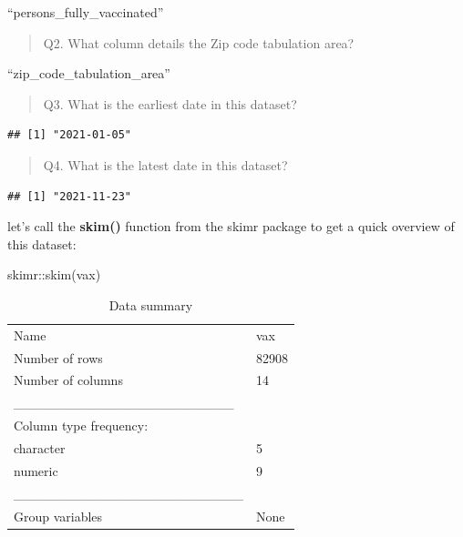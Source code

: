 \documentclass[
]{article}
\newenvironment{Shaded}{\begin{snugshade}}{\end{snugshade}}
\newcommand{\FunctionTok}[1]{\textcolor[rgb]{0.00,0.00,0.00}{#1}}
\newcommand{\NormalTok}[1]{#1}
\newcommand{\SpecialCharTok}[1]{\textcolor[rgb]{0.00,0.00,0.00}{#1}}
\begin{document}
``persons\_fully\_vaccinated''

\begin{quote}
Q2. What column details the Zip code tabulation area?
\end{quote}

``zip\_code\_tabulation\_area''

\begin{quote}
Q3. What is the earliest date in this dataset?
\end{quote}

\begin{Shaded}
\end{Shaded}

\begin{verbatim}
## [1] "2021-01-05"
\end{verbatim}

\begin{quote}
Q4. What is the latest date in this dataset?
\end{quote}

\begin{Shaded}
\end{Shaded}

\begin{verbatim}
## [1] "2021-11-23"
\end{verbatim}

let's call the \textbf{skim()} function from the skimr package to get a
quick overview of this dataset:

\begin{Shaded}
\begin{Highlighting}[]
\NormalTok{skimr}\SpecialCharTok{::}\FunctionTok{skim}\NormalTok{(vax)}
\end{Highlighting}
\end{Shaded}

\begin{longtable}[]{@{}ll@{}}
\caption{Data summary}\tabularnewline
\toprule
\endhead
Name & vax \\
Number of rows & 82908 \\
Number of columns & 14 \\
\_\_\_\_\_\_\_\_\_\_\_\_\_\_\_\_\_\_\_\_\_\_\_ & \\
Column type frequency: & \\
character & 5 \\
numeric & 9 \\
\_\_\_\_\_\_\_\_\_\_\_\_\_\_\_\_\_\_\_\_\_\_\_\_ & \\
Group variables & None \\
\bottomrule
\end{longtable}
\end{document}

